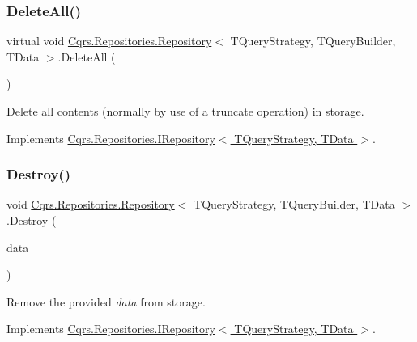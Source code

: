 \subsubsection{\texorpdfstring{Delete\+All()}{DeleteAll()}}
{\footnotesize\ttfamily virtual void \hyperlink{classCqrs_1_1Repositories_1_1Repository}{Cqrs.\+Repositories.\+Repository}$<$ T\+Query\+Strategy, T\+Query\+Builder, T\+Data $>$.Delete\+All (\begin{DoxyParamCaption}{ }\end{DoxyParamCaption})\hspace{0.3cm}{\ttfamily [virtual]}}



Delete all contents (normally by use of a truncate operation) in storage. 



Implements \hyperlink{interfaceCqrs_1_1Repositories_1_1IRepository_a0da5f756a0fd184dc51a81741f82734a_a0da5f756a0fd184dc51a81741f82734a}{Cqrs.\+Repositories.\+I\+Repository$<$ T\+Query\+Strategy, T\+Data $>$}.

\mbox{\label{classCqrs_1_1Repositories_1_1Repository_a6ed69cb5542164d9de81b0fa8a549d3e_a6ed69cb5542164d9de81b0fa8a549d3e}} 
\subsubsection{\texorpdfstring{Destroy()}{Destroy()}}
{\footnotesize\ttfamily void \hyperlink{classCqrs_1_1Repositories_1_1Repository}{Cqrs.\+Repositories.\+Repository}$<$ T\+Query\+Strategy, T\+Query\+Builder, T\+Data $>$.Destroy (\begin{DoxyParamCaption}\item[{T\+Data}]{data }\end{DoxyParamCaption})}



Remove the provided {\itshape data}  from storage. 



Implements \hyperlink{interfaceCqrs_1_1Repositories_1_1IRepository_a3a7a60be19498813b3822558b88fad66_a3a7a60be19498813b3822558b88fad66}{Cqrs.\+Repositories.\+I\+Repository$<$ T\+Query\+Strategy, T\+Data $>$}.

